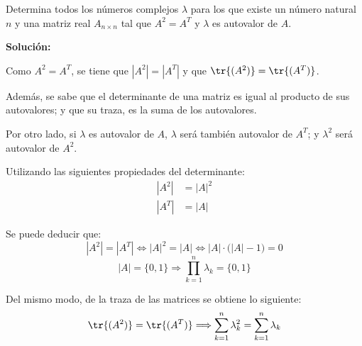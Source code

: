 \documentclass[../../main.tex]{subfiles}
\begin{document}
  \begin{shaded}
    Determina todos los números complejos $\lambda$ para los que existe un número natural $n$ y una matriz real $A_{n \times n}$ tal que $A^2 = A^T$ y $\lambda$ es autovalor de $A$.
  \end{shaded}

  \textbf{Solución:}

  Como $A^2 = A^T$, se tiene que $|A^2| = |A^T|$ y que $\tr{(A^2)} = \tr{(A^T)}$.

  Además, se sabe que el determinante de una matriz es igual al producto de sus autovalores; y que su traza, es la suma de los autovalores.

  Por otro lado, si $\lambda$ es autovalor de $A$, $\lambda$ será también autovalor de $A^T$; y $\lambda^2$ será autovalor de $A^2$.

  Utilizando las siguientes propiedades del determinante:
  \begin{align*} 
    |A^2| & =  |A|^2 
    \\ 
    |A^T| & =  |A|
  \end{align*}

  Se puede deducir que:
  $$
  |A^2| = |A^T| 
  \iff 
  |A|^2 = |A|
  \iff 
  |A| \cdot \big(|A| - 1\big) = 0
  $$
  $$
  |A| = \{0, 1\}\Longrightarrow \prod_{k = 1}^n \lambda_k = \{0, 1\}
  $$

  Del mismo modo, de la traza de las matrices se obtiene lo siguiente: 
  $$
  \tr{(A^2)} = \tr{(A^T)} \Longrightarrow \sum_{k = 1}^n \lambda_k^2 = \sum_{k = 1}^n \lambda_k
  $$
\end{document}

